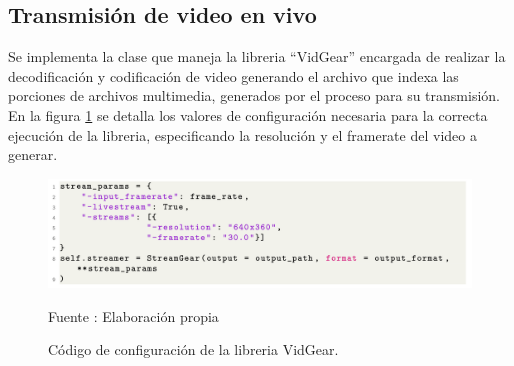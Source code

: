 \subsection{Transmisión de video en vivo}
Se implementa la clase que maneja la libreria ``VidGear'' encargada de realizar la decodificación y codificación de video generando el archivo que indexa las porciones de archivos multimedia, generados por el proceso para su transmisión. En la figura \ref{fig:vidgear} se detalla los valores de configuración necesaria para la correcta ejecución de la libreria, especificando la resolución y el framerate del video a generar.\\

\begin{figure}[H]
    \begin{center}
        \includegraphics[width=16cm]{img/capitulo_5/vidgear.png}
    \end{center}
    \begin{center}
        \caption{Código de configuración de la libreria VidGear.}
        Fuente : Elaboración propia
        \label{fig:vidgear}
    \end{center}
\end{figure}
